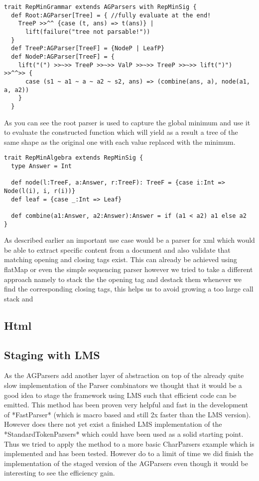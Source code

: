 \begin{lstlisting}
trait RepMinGrammar extends AGParsers with RepMinSig {
  def Root:AGParser[Tree] = { //fully evaluate at the end!
    TreeP >>^^ {case (t, ans) => t(ans)} |
      lift(failure("tree not parsable!"))
  }
  def TreeP:AGParser[TreeF] = {NodeP | LeafP}
  def NodeP:AGParser[TreeF] = {
    lift("(") >>~>> TreeP >>~>> ValP >>~>> TreeP >>~>> lift(")") >>^^>> {
      case (s1 ~ a1 ~ a ~ a2 ~ s2, ans) => (combine(ans, a), node(a1, a, a2))
    }
  }
\end{lstlisting}
As you can see the root parser is used to capture the global minimum and use it to evaluate the constructed function which will yield as a result a tree of the same shape as the original one with each value replaced with the minimum.

\begin{lstlisting}
trait RepMinAlgebra extends RepMinSig {
  type Answer = Int

  def node(l:TreeF, a:Answer, r:TreeF): TreeF = {case i:Int => Node(l(i), i, r(i))}
  def leaf = {case _:Int => Leaf}

  def combine(a1:Answer, a2:Answer):Answer = if (a1 < a2) a1 else a2
}
\end{lstlisting}

As described earlier an important use case would be a parser for xml which would be able to extract specific content from a document and also validate that matching opening and closing tags exist. This can already be achieved using flatMap or even the simple sequencing parser however we tried to take a different approach namely to stack the the opening tag and destack them whenever we find the corresponding closing tags, this helps us to avoid growing a too large call stack and 
\subsection{Html}


\subsection{Staging with LMS}
As the AGParsers add another layer of abstraction on top of the already quite slow implementation of the Parser combinators we thought that it would be a good idea to stage the framework using LMS such that efficient code can be emitted. This method has been proven very helpful and fast in the development of *FastParser* (which is macro based and still 2x faster than the LMS version).
However does there not yet exist a finished LMS implementation of the *StandardTokenParsers* which could have been used as a solid starting point. Thus we tried to apply the method to a more basic CharParsers example which is implemented and has been tested.
However do to a limit of time we did finish the implementation of the staged version of the AGParsers even though it would be interesting to see the efficiency gain.

